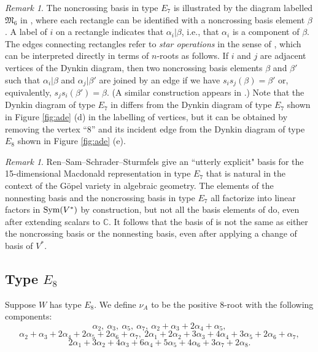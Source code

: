 \documentclass[11pt]{amsart}
\theoremstyle{plain}
\theoremstyle{definition}
\theoremstyle{remark}
\newtheorem{rmk}[theorem]{Remark}
\numberwithin{equation}{subsection}
\newcommand{\al}{\alpha}
\newcommand{\be}{\beta}
\newcommand{\C}{{\mathbb C}}
\newcommand{\fh}{V}
\newcommand{\Sym}{\text{\rm Sym}}
\begin{document}
\begin{rmk}\label{rmk:e7chen} The noncrossing basis in type $E_7$ is illustrated
      by the diagram labelled ${\mathfrak M}_6$ in \cite[Appendix]{chen98},
      where each rectangle can be identified with a noncrossing basis element
      $\be$. A label of $i$ on a rectangle indicates that $\al_i | \beta$, i.e.,
      that $\al_i$ is a component of $\be$. The edges connecting rectangles
      refer to {\it star operations} in the sense of \cite{kl79}, which can be
      interpreted directly in terms of $n$-roots as follows. If $i$ and $j$ are
      adjacent vertices of the Dynkin diagram, then two noncrossing basis
      elements $\be$ and $\be'$ such that $\al_i | \be$ and $\al_j | \be'$ are
      joined by an edge if we have $s_is_j(\be) = \be'$ or, equivalently,
      $s_js_i(\be') = \be$. (A similar construction appears in \cite[Lemma
      2.8]{gx3}.) Note that the Dynkin diagram of type $E_7$ in \cite{chen98}
      differs from the Dynkin diagram of type $E_7$ shown in Figure
      \ref{fig:ade} (d) in the labelling of vertices, but it can be obtained by
      removing the vertex ``8'' and its incident edge from the Dynkin diagram of
      type $E_8$ shown in Figure \ref{fig:ade} (e).
  \end{rmk}

\begin{rmk}\label{rmk:utterly}
Ren--Sam--Schrader--Sturmfels \cite[Theorem 4.1]{ren13} give an ``utterly
explicit" basis for the 15-dimensional Macdonald representation in type $E_7$
that is natural in the context of the G\"opel variety in algebraic geometry.
The elements of the nonnesting basis and the noncrossing basis in type $E_7$ all
factorize into linear factors in $\Sym(\fh^*)$ by construction, but not all the
basis elements of \cite[Theorem 4.1]{ren13} do, even after extending scalars to
$\C$. It follows that the basis of \cite{ren13} is not the same as either the
noncrossing basis or the nonnesting basis, even after applying a change of basis
of $\fh^*$.
\end{rmk}




\subsection{Type \texorpdfstring{$E_8$}{E8}}\label{sec:e8}
Suppose $W$ has type $E_8$.  We define $\nu_A$ to be the positive $8$-root with
the following components: $$ \al_2, \ \al_3, \ \al_5, \ \al_7,\ \al_2 + \al_3 +
2\al_4 + \al_5, $$ $$\al_2 + \al_3 + 2\al_4 + 2\al_5 + 2\al_6 + \al_7, \ 2\al_1
+ 2\al_2 + 3\al_3 + 4\al_4 + 3\al_5 + 2\al_6 + \al_7, $$ $$ 2\al_1 + 3\al_2 +
4\al_3 + 6\al_4 + 5\al_5 + 4\al_6 + 3\al_7 + 2\al_8 .$$
\end{document}
